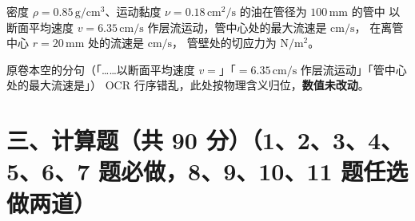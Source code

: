 \begin{ti}
  \item 密度 $\rho=0.85\,\mathrm{g/cm^3}$、运动黏度 $\nu=0.18\,\mathrm{cm^2/s}$ 的油在管径为 $100\,\mathrm{mm}$ 的管中
  以断面平均速度 $v=6.35\,\mathrm{cm/s}$ 作层流运动，管中心处的最大流速是 \underline{\hspace{2.5cm}} $\mathrm{cm/s}$，
  在离管中心 $r=20\,\mathrm{mm}$ 处的流速是 \underline{\hspace{2.5cm}} $\mathrm{cm/s}$，
  管壁处的切应力为 \underline{\hspace{2.5cm}} $\mathrm{N/m^2}$。\hfill{}
  \begin{tishi}原卷本空的分句（「……以断面平均速度 $v=$」「$=6.35\,\mathrm{cm/s}$ 作层流运动」「管中心处的最大流速是」）
  OCR 行序错乱，此处按物理含义归位，\textbf{数值未改动}。\end{tishi}
\end{ti}

\section{三、计算题（共 90 分）（1、2、3、4、5、6、7 题必做，8、9、10、11 题任选做两道）}

